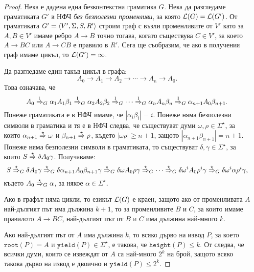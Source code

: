 \begin{proof}
  Нека е дадена една безконтекстна граматика $G$.
  Нека да разгледаме граматиката $G'$ в НФЧ {\em без безполезни променливи}, за която $\mathcal{L}(G) = \mathcal{L}(G')$.
  От граматиката $G' = \langle{V',\Sigma,S,R'}\rangle$ строим граф с възли променливите от $V'$ като
  за $A,B \in V'$ имаме ребро $A \to B$ точно тогава, когато съществува $C \in V'$,
  за което $A \to BC$ или $A \to CB$ е правило в $R'$.
  Сега ще съобразим, че ако в получения граф имаме цикъл, то $\mathcal{L}(G') = \infty$.

  Да разгледаме един такъв цикъл в графа:
  \[A_0 \to A_1 \to A_2 \to \cdots \to A_n \to A_0.\]
  Това означава, че 
  \[A_0 \stackrel{{1}}{\Rightarrow}_G \alpha_1 A_1 \beta_1 \stackrel{{1}}{\Rightarrow}_G \alpha_2 A_2 \beta_2 \stackrel{{1}}{\Rightarrow}_G \cdots \stackrel{{1}}{\Rightarrow}_G \alpha_n A_n \beta_n \stackrel{{1}}{\Rightarrow}_G \alpha_{n+1} A_0 \beta_{n+1}.\]
  Понеже граматиката е в НФЧ имаме, че $|\alpha_i\beta_i| = i$.
  Понеже няма безполезни символи в граматика и тя е в НФЧ следва, че съществуват думи $\omega,\rho \in \Sigma^\star$, за които $\alpha_{n+1} \stackrel{{\star}}{\Rightarrow} \omega$ и $\beta_{n+1} \stackrel{{\star}}{\Rightarrow} \rho$,
  където $|\omega\rho| \geq n+1$, защото $|\alpha_{n+1}\beta_{n+1}| = n+1$.
  Понеже няма безполезни символи в граматиката, то съществуват $\delta, \gamma \in \Sigma^\star$, за които
  $S \stackrel{{\star}}{\Rightarrow} \delta  A_0 \gamma$. Получаваме:
  \[ S \stackrel{{\star}}{\Rightarrow}_G \delta A_0 \gamma \stackrel{{\star}}{\Rightarrow}_G \delta \alpha_{n+1} A_0 \beta_{n+1} \gamma \stackrel{{\star}}{\Rightarrow}_G \delta \omega A_0 \rho\gamma \stackrel{{\star}}{\Rightarrow}_G \cdots \stackrel{{\star}}{\Rightarrow}_G \delta \omega^i A_0 \rho^i \gamma \stackrel{{\star}}{\Rightarrow}_G \delta\omega^i\alpha\rho^i\gamma,\]
  където $A_0 \stackrel{{\star}}{\Rightarrow}_G \alpha$, за някое $\alpha \in \Sigma^\star$.

  Ако в графът няма цикли, то езикът $\mathcal{L}(G)$ е краен, защото ако от променливата $A$ най-дългият път има дължина $k+1$,
  то за променливите $B$ и $C$, за които имаме правилото $A\to BC$, най-дългият път от $B$ и $C$ има дължина най-много $k$.

  Ако най-дългият път от $A$ има дължина $k$, то всяко дърво на извод $P$, за което $\texttt{root}(P) = A$ и $\texttt{yield}(P) \in \Sigma^\star$,
  е такова, че $\texttt{height}(P) \leq k$. От  следва, че всички думи, които се извеждат от $A$ са най-много $2^{k}$ на брой,
  защото всяко такова дърво на извод е двоично и $\texttt{yield}(P) \leq 2^k$.
\end{proof}

